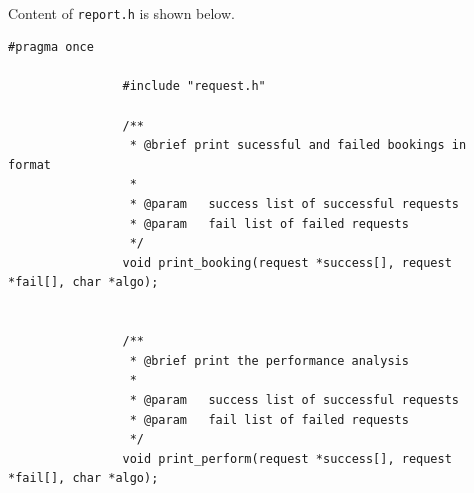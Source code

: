 \documentclass{article}
\begin{document}
            \paragraph{}
                Content of \texttt{report.h} is shown below.
            \begin{Verbatim}[gobble=8]
                #pragma once

                #include "request.h"
                
                /**
                 * @brief print sucessful and failed bookings in format
                 * 
                 * @param   success list of successful requests
                 * @param   fail list of failed requests
                 */
                void print_booking(request *success[], request *fail[], char *algo);
                
                
                /**
                 * @brief print the performance analysis
                 * 
                 * @param   success list of successful requests
                 * @param   fail list of failed requests
                 */
                void print_perform(request *success[], request *fail[], char *algo);                
            \end{Verbatim}
\end{document}
